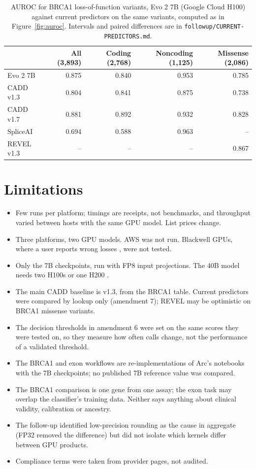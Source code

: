 \documentclass[11pt]{article}
\newcommand{\code}[1]{\texttt{#1}}
\begin{document}
\begin{table}[htbp]
\centering
\caption{AUROC for BRCA1 loss-of-function variants, Evo 2 7B (Google Cloud H100) against current
predictors on the same variants, computed as in Figure~\ref{fig:auroc}. Intervals and paired
differences are in \code{followup/CURRENT-PREDICTORS.md}.}
\label{tab:predictors}
\begin{tabular}{lrrrr}
\toprule
 & All (3,893) & Coding (2,768) & Noncoding (1,125) & Missense (2,086) \\
\midrule
Evo 2 7B & 0.875 & 0.840 & 0.953 & 0.785 \\
CADD v1.3 & 0.804 & 0.841 & 0.875 & 0.738 \\
CADD v1.7 & 0.881 & 0.892 & 0.932 & 0.828 \\
SpliceAI & 0.694 & 0.588 & 0.963 & -- \\
REVEL v1.3 & -- & -- & -- & 0.867 \\
\bottomrule
\end{tabular}
\end{table}

\section{Limitations}
\begin{itemize}
\item Few runs per platform; timings are receipts, not benchmarks, and throughput varied between
hosts with the same GPU model. List prices change.
\item Three platforms, two GPU models. AWS was not run. Blackwell GPUs, where a user reports wrong
losses \cite{arc157}, were not tested.
\item Only the 7B checkpoints, run with FP8 input projections. The 40B model needs two H100s or one
H200 \cite{nimprereq}.
\item The main CADD baseline is v1.3, from the BRCA1 table. Current predictors were compared by
lookup only (amendment 7); REVEL may be optimistic on BRCA1 missense variants.
\item The decision thresholds in amendment 6 were set on the same scores they were tested on, so
they measure how often calls change, not the performance of a validated threshold.
\item The BRCA1 and exon workflows are re-implementations of Arc's notebooks with the 7B
checkpoints; no published 7B reference value was compared.
\item The BRCA1 comparison is one gene from one assay; the exon task may overlap the classifier's
training data. Neither says anything about clinical validity, calibration or ancestry.
\item The follow-up identified low-precision rounding as the cause in aggregate (FP32 removed the
difference) but did not isolate which kernels differ between GPU products.
\item Compliance terms were taken from provider pages, not audited.
\end{itemize}
\end{document}
